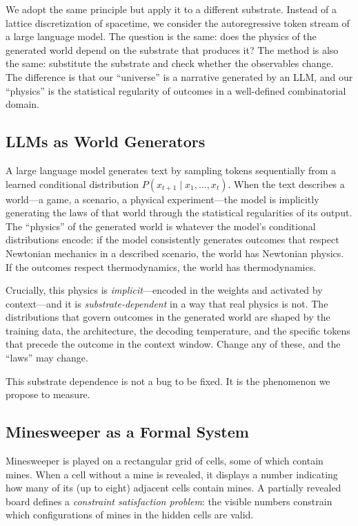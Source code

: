 \documentclass[12pt,a4paper]{article}
\begin{document}
We adopt the same principle but apply it to a different substrate. Instead of a lattice discretization of spacetime, we consider the autoregressive token stream of a large language model. The question is the same: does the physics of the generated world depend on the substrate that produces it? The method is also the same: substitute the substrate and check whether the observables change. The difference is that our ``universe'' is a narrative generated by an LLM, and our ``physics'' is the statistical regularity of outcomes in a well-defined combinatorial domain.

\subsection{LLMs as World Generators}
\label{sec:llm_worlds}

A large language model generates text by sampling tokens sequentially from a learned conditional distribution $P(x_{t+1} \mid x_1, \ldots, x_t)$. When the text describes a world---a game, a scenario, a physical experiment---the model is implicitly generating the laws of that world through the statistical regularities of its output. The ``physics'' of the generated world is whatever the model's conditional distributions encode: if the model consistently generates outcomes that respect Newtonian mechanics in a described scenario, the world has Newtonian physics. If the outcomes respect thermodynamics, the world has thermodynamics.

Crucially, this physics is \emph{implicit}---encoded in the weights and activated by context---and it is \emph{substrate-dependent} in a way that real physics is not. The distributions that govern outcomes in the generated world are shaped by the training data, the architecture, the decoding temperature, and the specific tokens that precede the outcome in the context window. Change any of these, and the ``laws'' may change.

This substrate dependence is not a bug to be fixed. It is the phenomenon we propose to measure.

\subsection{Minesweeper as a Formal System}
\label{sec:minesweeper_formal}

Minesweeper is played on a rectangular grid of cells, some of which contain mines. When a cell without a mine is revealed, it displays a number indicating how many of its (up to eight) adjacent cells contain mines. A partially revealed board defines a \emph{constraint satisfaction problem}: the visible numbers constrain which configurations of mines in the hidden cells are valid.
\end{document}
